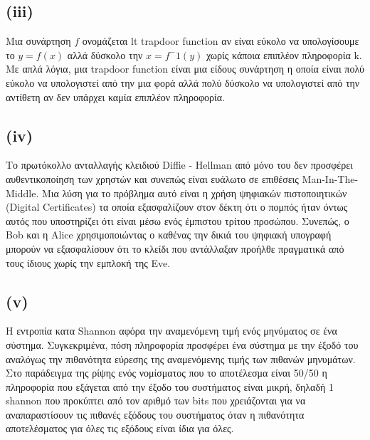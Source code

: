 \documentclass[a4paper, 11pt]{article}
\newcommand{\lt}{\latintext}
\begin{document}
\subsection*{({\lt iii})} Μια συνάρτηση $ f $ ονομάζεται {lt trapdoor function} αν είναι εύκολο να υπολογίσουμε το $ y = f(x) $ αλλά δύσκολο την $ x = f^-1(y) $ χωρίς κάποια επιπλέον πληροφορία {\lt k}. Με απλά λόγια, μια {\lt trapdoor function} είναι μια είδους συνάρτηση η οποία είναι πολύ εύκολο να υπολογιστεί από την μια φορά αλλά πολύ δύσκολο να υπολογιστεί από την αντίθετη αν δεν υπάρχει καμία επιπλέον πληροφορία. 


\subsection*{({\lt iv})} Το πρωτόκολλο ανταλλαγής κλειδιού {\lt Diffie - Hellman} από μόνο του δεν προσφέρει αυθεντικοποίηση των χρηστών και συνεπώς είναι ευάλωτο σε επιθέσεις {\lt Man-In-The-Middle}. Μια λύση για το πρόβλημα αυτό είναι η χρήση ψηφιακών πιστοποιητικών ({\lt Digital Certificates}) τα οποία εξασφαλίζουν στον δέκτη ότι ο πομπός ήταν όντως αυτός που υποστηρίζει ότι είναι μέσω ενός έμπιστου τρίτου προσώπου. Συνεπώς, ο {\lt Bob} και η {\lt Alice} χρησιμοποιώντας ο καθένας την δικιά του ψηφιακή υπογραφή μπορούν να εξασφαλίσουν ότι το κλείδι που αντάλλαξαν προήλθε πραγματικά από τους ίδιους χωρίς την εμπλοκή της {\lt Eve}. 


\subsection*{({\lt v})} Η εντροπία κατα {\lt Shannon} αφόρα την αναμενόμενη τιμή ενός μηνύματος σε ένα σύστημα. Συγκεκριμένα, πόση πληροφορία προσφέρει ένα σύστημα με την έξοδό του αναλόγως την πιθανότητα εύρεσης της αναμενόμενης τιμής των πιθανών μηνυμάτων. Στο παράδειγμα της ρίψης ενός νομίσματος που το αποτέλεσμα είναι 50/50 η πληροφορία που εξάγεται από την έξοδο του συστήματος είναι μικρή, δηλαδή 1 {\lt shannon} που προκύπτει από τον αριθμό των {\lt bits} που χρειάζονται για να αναπαραστίσουν τις πιθανές εξόδους του συστήματος όταν η πιθανότητα αποτελέσματος για όλες τις εξόδους είναι ίδια για όλες.
\end{document}

